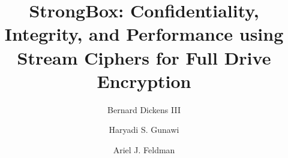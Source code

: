 \documentclass[sigplan,10pt]{acmart}\settopmatter{}
\begin{document}
\title{StrongBox: Confidentiality, Integrity, and Performance using Stream
Ciphers for Full Drive Encryption}



\author{Bernard Dickens III}

\author{Haryadi S. Gunawi}

\author{Ariel J. Feldman}
\end{document}
